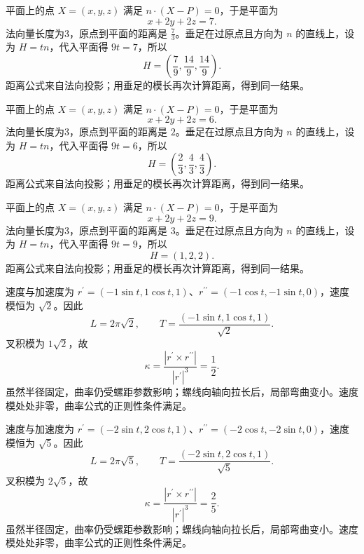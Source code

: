 \documentclass[UTF8,12pt,a4paper,fontset=fandol]{ctexart}
\begin{document}
\begin{solve}\label{ans:c31q10}
平面上的点 $X=(x,y,z)$ 满足 $n\cdot(X-P)=0$，于是平面为
\[
x+2y+2z=7.
\]
法向量长度为3，原点到平面的距离是 $\frac{7}{3}$。垂足在过原点且方向为 $n$ 的直线上，设为 $H=tn$，代入平面得 $9t=7$，所以
\[
H=\left(\frac{7}{9},\frac{14}{9},\frac{14}{9}\right).
\]
距离公式来自法向投影；用垂足的模长再次计算距离，得到同一结果。
\end{solve}

\begin{solve}\label{ans:c31q11}
平面上的点 $X=(x,y,z)$ 满足 $n\cdot(X-P)=0$，于是平面为
\[
x+2y+2z=6.
\]
法向量长度为3，原点到平面的距离是 $2$。垂足在过原点且方向为 $n$ 的直线上，设为 $H=tn$，代入平面得 $9t=6$，所以
\[
H=\left(\frac{2}{3},\frac{4}{3},\frac{4}{3}\right).
\]
距离公式来自法向投影；用垂足的模长再次计算距离，得到同一结果。
\end{solve}

\begin{solve}\label{ans:c31q12}
平面上的点 $X=(x,y,z)$ 满足 $n\cdot(X-P)=0$，于是平面为
\[
x+2y+2z=9.
\]
法向量长度为3，原点到平面的距离是 $3$。垂足在过原点且方向为 $n$ 的直线上，设为 $H=tn$，代入平面得 $9t=9$，所以
\[
H=\left(1,2,2\right).
\]
距离公式来自法向投影；用垂足的模长再次计算距离，得到同一结果。
\end{solve}

\begin{solve}\label{ans:c31q13}
速度与加速度为 $r^{\prime}=(-1\sin t,1\cos t,1)$、$r^{\prime\prime}=(-1\cos t,-1\sin t,0)$，速度模恒为 $\sqrt{2}$。因此
\[
L=2\pi\sqrt{2},\qquad T=\frac{(-1\sin t,1\cos t,1)}{\sqrt{2}}.
\]
叉积模为 $1\sqrt{2}$，故
\[
\kappa=\frac{|r^{\prime}\times r^{\prime\prime}|}{|r^{\prime}|^3}=\frac{1}{2}.
\]
虽然半径固定，曲率仍受螺距参数影响；螺线向轴向拉长后，局部弯曲变小。速度模处处非零，曲率公式的正则性条件满足。
\end{solve}

\begin{solve}\label{ans:c31q14}
速度与加速度为 $r^{\prime}=(-2\sin t,2\cos t,1)$、$r^{\prime\prime}=(-2\cos t,-2\sin t,0)$，速度模恒为 $\sqrt{5}$。因此
\[
L=2\pi\sqrt{5},\qquad T=\frac{(-2\sin t,2\cos t,1)}{\sqrt{5}}.
\]
叉积模为 $2\sqrt{5}$，故
\[
\kappa=\frac{|r^{\prime}\times r^{\prime\prime}|}{|r^{\prime}|^3}=\frac{2}{5}.
\]
虽然半径固定，曲率仍受螺距参数影响；螺线向轴向拉长后，局部弯曲变小。速度模处处非零，曲率公式的正则性条件满足。
\end{solve}
\end{document}
